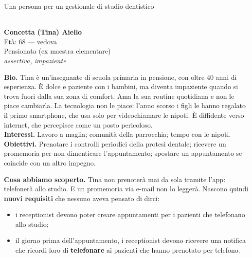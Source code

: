 \begin{esempio}{Una persona per un gestionale di studio dentistico}
\begin{center}
\begin{tcolorbox}[enhanced, breakable=false, colback=white, colframe=ph3, boxrule=1pt, arc=3pt, drop fuzzy shadow,
   width=\linewidth, left=6pt, right=6pt]
\begin{minipage}[t]{0.30\linewidth}
  \centering
  \\[4pt]
  {\small\textbf{Concetta (Tina) Aiello}}\\[2pt]
  {\scriptsize Età: 68 --- vedova\\ Pensionata (ex maestra elementare)\\ \textit{assertiva, impaziente}}
\end{minipage}\hfill
\begin{minipage}[t]{0.66\linewidth}
  \small\textbf{Bio.} Tina è un'insegnante di scuola primaria in pensione, con oltre 40 anni di esperienza. È dolce e paziente
  con i bambini, ma diventa impaziente quando si trova fuori dalla sua zona di comfort. Ama la sua routine quotidiana e non
  le piace cambiarla. La tecnologia non le piace: l'anno scorso i figli le hanno regalato il primo smartphone, che usa solo per
  videochiamare le nipoti. È diffidente verso internet, che percepisce come un posto pericoloso.\\[3pt]
  \textbf{Interessi.} Lavoro a maglia; comunità della parrocchia; tempo con le nipoti.\\[3pt]
  \textbf{Obiettivi.} Prenotare i controlli periodici della protesi dentale; ricevere un promemoria per non dimenticare
  l'appuntamento; spostare un appuntamento se coincide con un altro impegno.
\end{minipage}
\end{tcolorbox}
\end{center}

\textbf{Cosa abbiamo scoperto.} Tina non prenoterà mai da sola tramite l'app: telefonerà allo studio. E un promemoria via e-mail
non lo leggerà. Nascono quindi \textbf{nuovi requisiti} che nessuno aveva pensato di dirci:
\begin{itemize}\itemsep1pt
  \item i receptionist devono poter creare appuntamenti per i pazienti che telefonano allo studio;
  \item il giorno prima dell'appuntamento, i receptionist devono ricevere una notifica che ricordi loro di \textbf{telefonare}
        ai pazienti che hanno prenotato per telefono.
\end{itemize}
\end{esempio}

